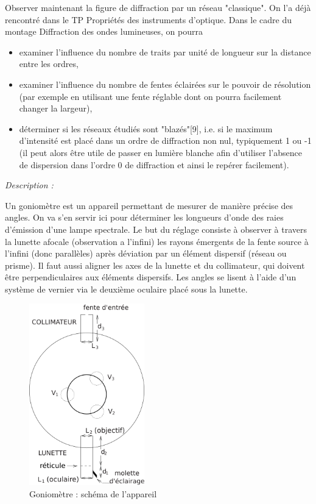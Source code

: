 \documentclass{article}%
\begin{document}
Observer maintenant la figure de diffraction par un réseau "classique". On l'a déjà rencontré dans le TP Propriétés des instruments d'optique. Dans le cadre du montage Diffraction des ondes lumineuses, on pourra

\begin{itemize}
	\item    examiner l'influence du nombre de traits par unité de longueur sur la distance entre les ordres,
	\item    examiner l'influence du nombre de fentes éclairées sur le pouvoir de résolution (par exemple en utilisant une fente réglable dont on pourra facilement changer la largeur),
	\item    déterminer si les réseaux étudiés sont "blazés"[9], i.e. si le maximum d'intensité est placé dans un ordre de diffraction non nul, typiquement 1 ou -1 (il peut alors être utile de passer en lumière blanche afin d'utiliser l'absence de dispersion dans l'ordre 0 de diffraction et ainsi le repérer facilement).
\end{itemize}

\textit{Description :}

Un goniomètre est un appareil permettant de mesurer de manière précise des angles. On va s’en servir ici pour déterminer les longueurs d’onde des raies d’émission d'une lampe spectrale. Le but du réglage consiste à observer à travers la lunette afocale (observation a l’infini) les rayons émergents de la fente source à l’infini (donc parallèles) après déviation par un élément dispersif (réseau ou prisme). Il faut aussi aligner les axes de la lunette et du collimateur, qui doivent être perpendiculaires aux éléments dispersifs. Les angles se lisent à l’aide d’un système de vernier via le deuxième oculaire placé sous la lunette.
\begin{figure}
	\centerline{\includegraphics[width=5cm]{images-exp/FigureGonioDessus.png}}
	\caption{Goniomètre : schéma de l'appareil}
\end{figure}
\end{document}
